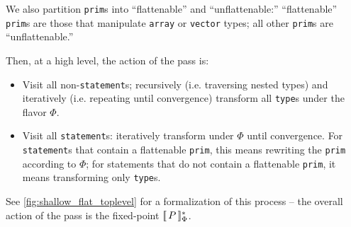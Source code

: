 We also partition \texttt{prim}s into ``flattenable'' and ``unflattenable:''
``flattenable'' \texttt{prim}s are those that manipulate \texttt{array}
or \texttt{vector} types; all other \texttt{prim}s are ``unflattenable.''

Then, at a high level, the action of the pass is:
\begin{itemize}
\item Visit all non-\texttt{statement}s; recursively
(i.e. traversing nested types) and iteratively (i.e. repeating until
convergence) transform all \texttt{type}s under the flavor $\Phi$.

\item Visit all \texttt{statement}s: iteratively transform under $\Phi$ until convergence.
For \texttt{statement}s that contain a flattenable \texttt{prim}, this means
rewriting the \texttt{prim} according to $\Phi$; for statements that do not
contain a flattenable \texttt{prim}, it means transforming only \texttt{type}s.

\end{itemize}

See \cref{fig:shallow_flat_toplevel} for a formalization of this process -- the
overall action of the pass is the fixed-point $[\![\, P \,]\!]_\Phi^*$.

